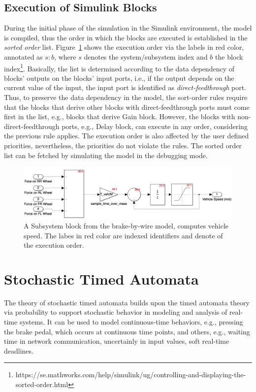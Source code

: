 \subsection*{Execution of Simulink Blocks}
During the initial phase of the simulation in the Simulink environment, the model is compiled, thus the order in which the blocks are executed is established in the \textit{sorted order} list. Figure~\ref{fig_sm_exec_order} shows the execution order via the labels in red color, annotated as $s:b$, where $s$ denotes the system/subsystem index and $b$ the block index\footnote{https://se.mathworks.com/help/simulink/ug/controlling-and-displaying-the-sorted-order.html}. Basically, the list is determined according to the data dependency of blocks' outputs on the blocks' input ports, i.e., if the output depends on the current value of the input, the input port is identified as \textit{direct-feedthrough} port. Thus, to preserve the data dependency in the model, the sort-order rules require that the blocks that derive other blocks with direct-feedthrough ports must come first in the list, e.g., blocks that derive Gain block. However, the blocks with non-direct-feedthrough ports, e.g., Delay block, can execute in any order, considering the previous rule applies. The execution order is also affected by the user defined priorities, nevertheless, the priorities do not violate the rules. The sorted order list can be fetched by simulating the model in the debugging mode.
\begin{figure}
	\centering
	\includegraphics[width=1\linewidth]{images/sm_exec_order}
	\caption{A Subsystem block from the brake-by-wire model, computes vehicle speed. The labes in red color are indexed identifiers and denote of the execution order.}
	\label{fig_sm_exec_order}
\end{figure}

\section{Stochastic Timed Automata}
The theory of stochastic timed automata builds upon the timed automata theory via probability to support stochastic behavior in modeling and analysis of real-time systems. It can be used to model continuous-time behaviors, e.g., pressing the brake pedal, which occurs at continuous time points, and others, e.g., waiting time in network communication, uncertainly in input values, soft real-time deadlines. 

